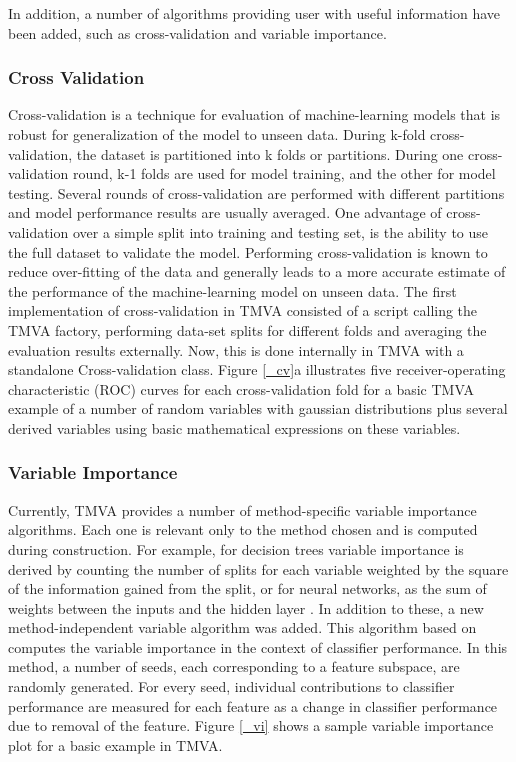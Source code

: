 \documentclass[a4paper]{jpconf}
\begin{document}
In addition, a number of algorithms providing user with useful information have been added, such as cross-validation and variable importance. 



\subsubsection{Cross Validation} 
Cross-validation is a technique for evaluation of machine-learning models that is robust for generalization of the model to unseen data. During k-fold cross-validation, the dataset is partitioned into k folds or partitions. During one cross-validation round, k-1 folds are used for model training, and the other for model testing. Several rounds of cross-validation are performed with different partitions and model performance results are usually averaged. 
One advantage of cross-validation over a simple split into training and testing set, is the ability to use the full dataset to validate the model. Performing cross-validation is known to reduce over-fitting of the data and generally leads to a more accurate estimate of the performance of the machine-learning model on unseen data. The first implementation of cross-validation in TMVA consisted of a script calling the TMVA factory, performing data-set splits for different folds and averaging the evaluation results externally. Now, this is done internally in TMVA with a standalone Cross-validation class. Figure \ref{_cv}a illustrates five receiver-operating characteristic (ROC) curves for each cross-validation fold for a basic TMVA example of a number of random variables with gaussian distributions plus several derived variables using basic mathematical expressions on these variables.

\subsubsection{Variable Importance}
Currently, TMVA provides a number of method-specific variable importance algorithms. Each one is relevant only to the method chosen and is computed during construction. For example, for decision trees variable importance is derived by counting the number of splits for each variable weighted by the square of the information gained from the split,   or for neural networks, as the sum of weights between the inputs and the hidden layer \cite{Hocker:2007ht}.
In addition to these, a new method-independent variable algorithm was added. This algorithm based on \cite{gleyzer2008paradigm} computes the variable importance in the context of classifier performance. In this method, a number of seeds, each corresponding to a feature subspace, are randomly generated. For every seed, individual contributions to classifier performance are measured for each feature as a change in classifier performance due to removal of the feature. Figure \ref{_vi} shows a sample variable importance plot for a basic example in TMVA.
\end{document}
